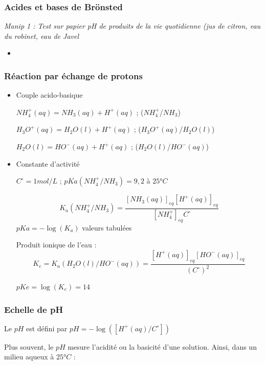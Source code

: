 \documentclass{article}%
\begin{document}
\subsubsection{Acides et bases de Brönsted}
\textit{Manip 1 : Test sur papier pH de produits de la vie quotidienne (jus de citron, eau du robinet, eau de Javel}

	\begin{itemize}
		\item {}
\end{itemize}

\subsubsection{Réaction par échange de protons}

	\begin{itemize}
\item Couple acido-basique

	$NH_4^+(aq) = NH_3(aq) + H^+(aq)$ ; ($NH_4^+$/$NH_3$)

	$H_3O^+(aq) = H_2O(l) + H^+(aq)$ ; ($H_3O^+(aq)$/$H_2O(l)$)

	$H_2O(l) = HO^-(aq) + H^+(aq)$ ; ($H_2O(l)$/$HO^-(aq)$)

\item Constante d'activité

$C^\circ = 1 mol/L$ ; $pKa(NH_4^+/NH_3) = 9,2$ à $25°C$

\[K_a(NH_4^+/NH_3) =\frac{[NH_3(aq)]_{eq}[H^+(aq)]_{eq}}{[NH_4^+]_{eq} C^\circ}\]
	$pKa = -\log (K_a)$ valeurs tabulées 

Produit ionique de l'eau : \[K_e = K_a(H_2O(l)/HO^-(aq))=\frac{[H^+(aq)]_{eq}[HO^-(aq)]_{eq}}{(C^\circ)^2}\]

$pKe = \log(K_e) =14$

\end{itemize}

\subsubsection{Echelle de pH}
Le $pH$ est défini par $pH = -\log ([H^+(aq)/C^\circ])$ 


Plus souvent, le $pH$ mesure l’acidité ou la basicité d’une solution. Ainsi, dans un milieu aqueux à $25 °C$ :
\end{document}
